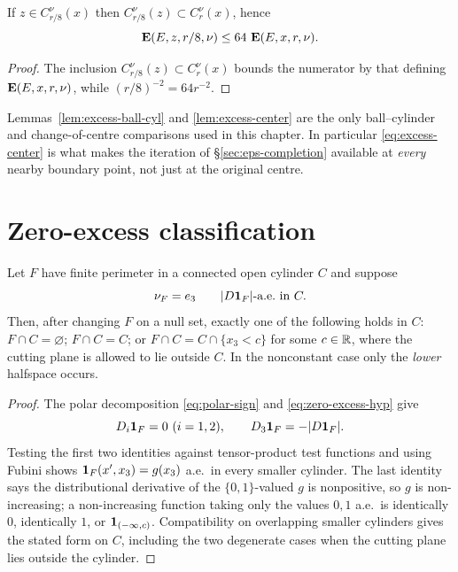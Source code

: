 \begin{lemma}\label{lem:excess-center}
If $z\in C_{r/8}^\nu(x)$ then $C_{r/8}^\nu(z)\subset C_r^\nu(x)$, hence
\begin{equation}\label{eq:excess-center}
  \operatorname{\mathbf E}(E,z,r/8,\nu)\le64\,\operatorname{\mathbf E}(E,x,r,\nu).
\end{equation}
\end{lemma}

\begin{proof}
The inclusion $C_{r/8}^\nu(z)\subset C_r^\nu(x)$ bounds the numerator by
that defining $\operatorname{\mathbf E}(E,x,r,\nu)$, while $(r/8)^{-2}=64r^{-2}$.
\end{proof}

\begin{fnote}\label{fnote:excess-comparisons}
Lemmas~\ref{lem:excess-ball-cyl} and \ref{lem:excess-center} are the only
ball--cylinder and change-of-centre comparisons used in this chapter.  In
particular \eqref{eq:excess-center} is what makes the iteration of
\S\ref{sec:eps-completion} available at \emph{every} nearby boundary point,
not just at the original centre.
\end{fnote}

\section{Zero-excess classification}

\begin{lemma}\label{lem:zero-excess}
Let $F$ have finite perimeter in a connected open cylinder $C$ and suppose
\begin{equation}\label{eq:zero-excess-hyp}
  \nu_F=e_3\qquad|D\mathbf 1_{F}|\text{-a.e.\ in }C .
\end{equation}
Then, after changing $F$ on a null set, exactly one of the following holds in
$C$: $F\cap C=\varnothing$; $F\cap C=C$; or
$F\cap C=C\cap\{x_3<c\}$ for some $c\in\mathbb R$, where the cutting plane is allowed
to lie outside $C$.  In the nonconstant case only the \emph{lower} halfspace
occurs.
\end{lemma}

\begin{proof}
The polar decomposition \eqref{eq:polar-sign} and
\eqref{eq:zero-excess-hyp} give
\begin{equation}\label{eq:zero-excess-derivs}
  D_i\mathbf 1_{F}=0\ (i=1,2),
  \qquad
  D_3\mathbf 1_{F}=-|D\mathbf 1_{F}| .
\end{equation}
Testing the first two identities against tensor-product test functions and
using Fubini shows $\mathbf 1_{F}(x',x_3)=g(x_3)$ a.e.\ in every smaller cylinder.
The last identity says the distributional derivative of the
$\{0,1\}$-valued $g$ is nonpositive, so $g$ is non-increasing; a
non-increasing function taking only the values $0,1$ a.e.\ is identically
$0$, identically $1$, or $\mathbf 1_{(-\infty,c)}$.  Compatibility on overlapping
smaller cylinders gives the stated form on $C$, including the two degenerate
cases when the cutting plane lies outside the cylinder.
\end{proof}


